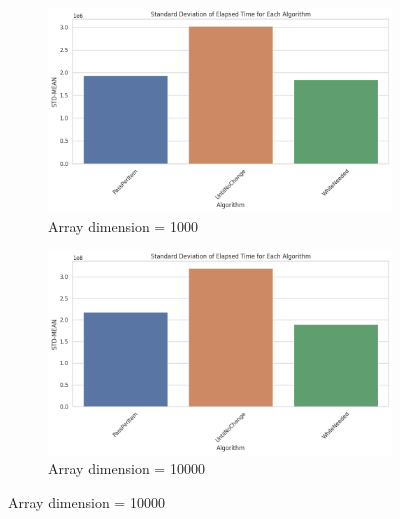 \documentclass{article}
\begin{document}
\begin{figure}[H]
    \centering
    \begin{subfigure}[b]{0.4\textwidth}
        \centering
        \includegraphics[width=\textwidth]{./data/std_algo_1000.png}
        \caption{Array dimension = 1000}
    \end{subfigure}
    \hfill
    \begin{subfigure}[b]{0.4\textwidth}
        \centering
        \includegraphics[width=\textwidth]{./data/std_algo_10000.png}
        \caption{Array dimension = 10000}
    \end{subfigure}
\end{figure}
\end{document}
